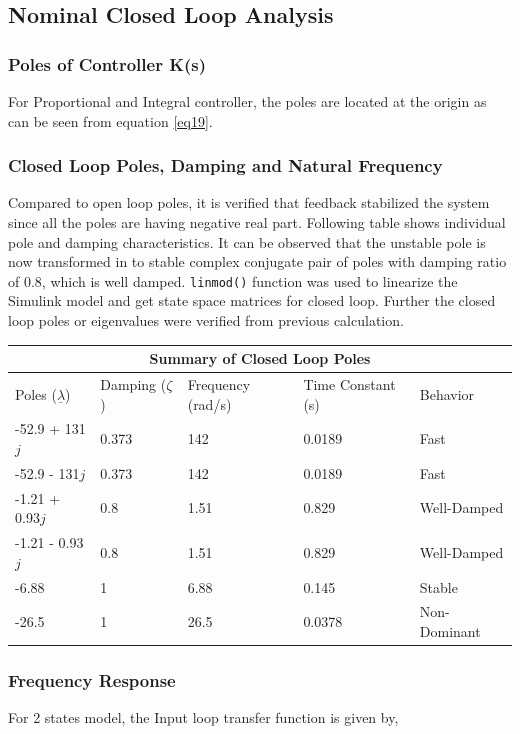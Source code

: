 \documentclass[12pt]{article}
\begin{document}
	\subsection{Nominal Closed Loop Analysis}
	\subsubsection{Poles of Controller K(s)}
	For Proportional and Integral controller, the poles are located at the origin as can be seen from equation \ref{eq19}.
	
	\subsubsection{Closed Loop Poles, Damping and Natural Frequency}
	Compared to open loop poles, it is verified that feedback stabilized the system since all the poles are having negative real part. Following table shows individual pole and damping characteristics. It can be observed that the unstable pole is now transformed in to stable complex conjugate pair of poles with damping ratio of 0.8, which is well damped. \texttt{linmod()} function was used to linearize the Simulink model and get state space matrices for closed loop. Further the closed loop poles or eigenvalues were verified from previous calculation.
	
	\begin{center}
		\begin{tabular}{ |p{2.4cm}|p{2.3cm}|p{2cm}|p{3.5cm}||p{3.5cm}|  }
			\hline
			\multicolumn{5}{|c|}{Summary of Closed Loop Poles} \\
			\hline
			Poles ($\underline{\lambda}$)  & Damping ($\zeta$) & Frequency (rad/s) & Time Constant (s) & Behavior\\ \hline
			-52.9 + 131$j$ & 0.373 & 142 & 0.0189 & Fast\\
			-52.9 - 131$j$  & 0.373 & 142 & 0.0189 & Fast\\
			-1.21  + 0.93$j$ & 0.8 & 1.51 & 0.829 & Well-Damped\\
			-1.21  - 0.93$j$ & 0.8 & 1.51 & 0.829 & Well-Damped\\
			-6.88 & 1 & 6.88 & 0.145 & Stable\\
			-26.5 & 1 & 26.5 & 0.0378 & Non-Dominant\\
			\hline
		\end{tabular}
	\end{center}
	
	\subsubsection{Frequency Response}
	For 2 states model, the Input loop transfer function is given by,
	
\end{document}
